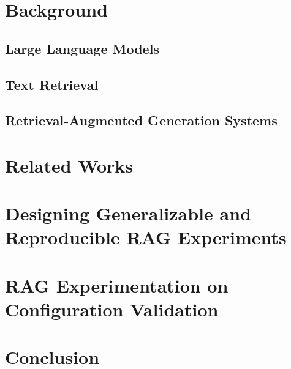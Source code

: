 \documentclass[english,master]{swsLeipzig}
\begin{document}
\chapter{Background}\label{chap:background}


\section{Large Language Models}\label{sec:llm}


\section{Text Retrieval}\label{sec:retrieval}


% 

\section{Retrieval-Augmented Generation Systems}\label{sec:rag}



\chapter{Related Works}\label{chap:relwork}


\chapter{Designing Generalizable and Reproducible RAG Experiments}\label{chap:design}


\chapter{RAG Experimentation on Configuration Validation}\label{chap:Experiment}


\chapter{Conclusion}\label{chap:Conclusion}


\appendix



\end{document}
